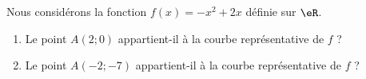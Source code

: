 
\begin{exercice}\label{exoSeconde-0043}

  Nous considérons la fonction $f(x)=-x^2+2x$ définie sur \( \eR\).
  \begin{enumerate}
      \item
        Le point $A(2;0)$ appartient-il à la courbe représentative de \( f\)  ?
        
  \item
        Le point $A(-2;-7)$ appartient-il à la courbe représentative de \( f\)  ?
  \end{enumerate}

\end{exercice}
